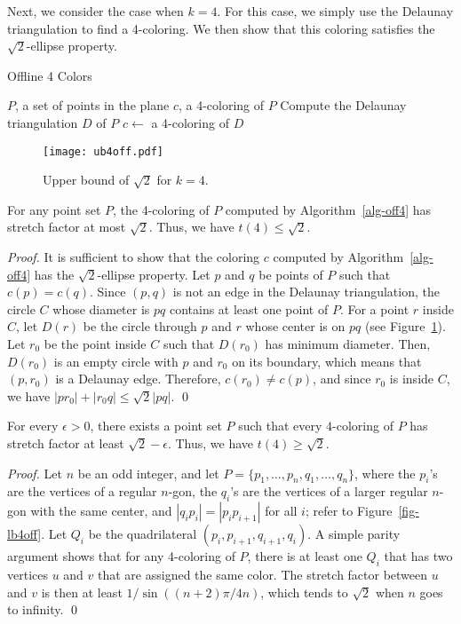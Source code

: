 \documentclass[pdftex,leqno,fleqn,12pts]{llncs}
\begin{document}
Next, we consider the case when $k=4$. For this case, we simply use the 
Delaunay triangulation to find a 4-coloring. We then show that this 
coloring satisfies the $\sqrt{2}$-ellipse property.

\begin{algorithm}
\caption{Offline 4 Colors}\label{alg-off4}
\begin{algorithmic}[1]
\REQUIRE $P$, a set of points in the plane 
\ENSURE $c$, a 4-coloring of $P$ 
\STATE Compute the Delaunay triangulation $D$ of $P$ 
\STATE $c\leftarrow$ a 4-coloring of $D$
\end{algorithmic}
\end{algorithm}

\begin{figure}
\centering\texttt{[image: ub4off.pdf]}\caption{Upper bound of $\sqrt{2}$ for
$k=4$.}\label{fig-ub4off}
\end{figure}


\begin{lemma}    \label{prop-ub4off} 
For any point set $P$, the 4-coloring of $P$ computed by 
Algorithm~\ref{alg-off4} has stretch factor at most $\sqrt{2}$. 
Thus, we have $t(4)\leq \sqrt{2}$.
\end{lemma}
\begin{proof}
It is sufficient to show that the coloring $c$ computed by
Algorithm~\ref{alg-off4} has the $\sqrt{2}$-ellipse property. 
Let $p$ and $q$ be points of $P$ such that $c(p)=c(q)$. Since $(p,q)$
is not an edge in the Delaunay triangulation, the circle $C$ whose 
diameter is $pq$ contains at least one point of $P$. For a point $r$ 
inside $C$, let $D(r)$ be the circle through $p$ and $r$ whose center 
is on $pq$ (see Figure~\ref{fig-ub4off}). Let $r_0$ be the point inside 
$C$ such that $D(r_0)$ has minimum diameter. Then, $D(r_0)$ is an empty
circle with $p$ and $r_0$ on its boundary, which means that $(p,r_0)$
is a Delaunay edge. Therefore, $c(r_0)\neq c(p)$, and since $r_0$ is
inside $C$, we have $|pr_0|+|r_0q|\leq \sqrt{2}|pq|$.
\qed 
\end{proof}

\begin{lemma} 
For every $\epsilon>0$, there exists a point set $P$ such that every
$4$-coloring of $P$ has stretch factor at least $\sqrt{2}-\epsilon$.
Thus, we have $t(4)\geq \sqrt{2}$.
\end{lemma}
\begin{proof} 
Let $n$ be an odd integer, and let 
$P=\{p_1,\ldots,p_n,q_1,\ldots,q_n\}$, where the $p_i$'s are the 
vertices of a regular $n$-gon, the $q_i$'s are the vertices of a larger 
regular $n$-gon with the same center, and $|q_ip_i|=|p_ip_{i+1}|$ for 
all $i$; refer to Figure~\ref{fig-lb4off}.
Let $Q_i$ be the quadrilateral $(p_i,p_{i+1},q_{i+1},q_i)$. A simple 
parity argument shows that for any 4-coloring of $P$, there is at 
least one $Q_i$ that has two vertices $u$ and $v$ that are assigned the 
same color. The stretch factor between $u$ and $v$ is then at least
$1/ \sin((n+2)\pi/4n)$, which tends to $\sqrt{2}$ when $n$ goes to
infinity.
\qed 
\end{proof}
\end{document}
